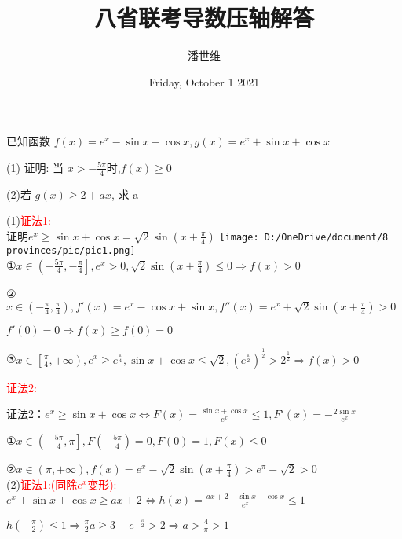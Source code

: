 \documentclass[a4paper,12pt]{article}
\begin{document}
\title {八省联考导数压轴解答}
\author{潘世维}
\date{Friday, October 1 2021}
\maketitle

已知函数 $ f(x)=e^{x}-\sin x-\cos x, g(x)=e^{x}+\sin x+\cos x$


(1) 证明: 当 $ x>-\frac{5 \pi}{4}  $时,$  f(x) \geq 0 $



(2)若 $ g(x) \geq 2+a x $, 求  a 
\begin{flushleft}

(1)\textcolor{red}{证法1:}\\
证明$e^x \ge \sin x + \cos x = \sqrt 2 \sin \left( x + \frac{\pi }{4} \right) $
\texttt{[image: D:/OneDrive/document/8 provinces/pic/pic1.png]}\\
①$x \in \left( { - \frac{{5\pi }}{4}, - \frac{\pi }{4}} \right],{e^x} > 0,\sqrt 2 \sin \left( {x + \frac{\pi }{4}} \right) \le 0 \Rightarrow f(x) > 0$

②$x \in \left( { - \frac{\pi }{4},\frac{\pi }{4}} \right),f'(x) = {e^x} - \cos x + \sin x,f''(x) = {e^x} + \sqrt 2 \sin \left( {x + \frac{\pi }{4}} \right) > 0$

$  f'(0) = 0 \Rightarrow f(x) \ge f(0) = 0$

③$\left. {x \in \left[ {\frac{\pi }{4}, + \infty } \right.} \right),{e^x} \ge {e^{\frac{\pi }{4}}},\sin x + \cos x \le \sqrt 2 ,{\left( {{e^{\frac{\pi }{2}}}} \right)^{\frac{1}{2}}} > {2^{\frac{1}{2}}} \Rightarrow f(x) > 0$

\textcolor{red}{证法2:}

证法2：$e^x \ge \sin x + \cos x \Leftrightarrow F(x) = \frac{{\sin x + \cos x}}{{{e^x}}} \le 1 ,F'(x) =  - \frac{{2\sin x}}{{{e^x}}}$

①$x \in \left. {\left( { - \frac{{5\pi }}{4},\pi } \right.} \right],F( - \frac{{5\pi }}{4}) = 0,F(0) = 1,F(x) \le 0$

②$\left. {x \in \left( \pi , + \infty  \right.} \right),f(x) = {e^x} - \sqrt 2 \sin (x + \frac{\pi }{4}) > {e^\pi } - \sqrt 2  > 0$
\\(2)\textcolor{red}{证法1:(同除$e^x$变形):}
${e^x} + \sin x + \cos x \ge ax + 2 \Leftrightarrow h(x) = \frac{{ax + 2 - \sin x - \cos x}}{{{e^x}}} \le 1$

$h\left( { - \frac{\pi }{2}} \right) \le 1 \Rightarrow \frac{\pi }{2}a \ge 3 - {e^{ - \frac{\pi }{2}}} > 2 \Rightarrow a > \frac{4}{\pi } >1 $


\end{flushleft}
\end{document}
